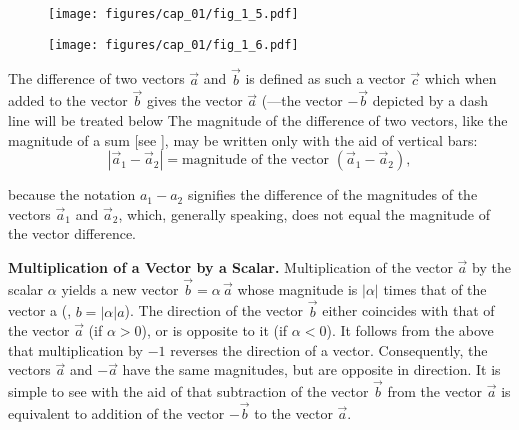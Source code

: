 \begin{figure}[t]
	\begin{minipage}[t]{0.5\linewidth}
		\begin{center}
			\texttt{[image: figures/cap\_01/fig\_1\_5.pdf]}
			\caption[]{}
			\label{fig:1_5}
		\end{center}
	\end{minipage}
	\hfill{ }%
	\begin{minipage}[t]{0.5\linewidth}
		\begin{center}
			\texttt{[image: figures/cap\_01/fig\_1\_6.pdf]}
			\caption[]{}
			\label{fig:1_6}
		\end{center}
	\end{minipage}
\vspace{-0.7cm}
\end{figure}

The difference of two vectors $\vec{a}$ and $\vec{b}$ is defined as such a vector $\vec{c}$ which when added to the vector $\vec{b}$ gives the vector $\vec{a}$ (---the vector $-\vec{b}$ depicted by a dash line will be treated below The magnitude of the difference of two vectors, like the magnitude of a sum [see ], may be written only with the aid of vertical bars:
\begin{equation}\label{eq:1_2}
|\vec{a}_1 - \vec{a}_2| = \text{magnitude of the vector } (\vec{a}_1 - \vec{a}_2),
\end{equation}

\noindent
because the notation $a_1-a_2$ signifies the difference of the magnitudes of the vectors $\vec{a}_1$ and $\vec{a}_2$, which, generally speaking, does not equal the magnitude of the vector difference.

\textbf{Multiplication of a Vector by a Scalar.} Multiplication of the vector $\vec{a}$ by the scalar $\alpha$ yields a new vector $\vec{b}=\alpha\,\vec{a}$ whose magnitude is $|\alpha|$ times that of the vector a (\ie, $b=|\alpha|a$). The direction of the vector $\vec{b}$ either coincides with that of the vector $\vec{a}$ (if $\alpha>0$), or is opposite to it (if $\alpha<0$). It follows from the above that multiplication by $-1$ reverses the direction of a vector. Consequently, the vectors $\vec{a}$ and $-\vec{a}$ have the same magnitudes, but are opposite in direction. It is simple to see with the aid of   that subtraction of the vector $\vec{b}$ from the vector $\vec{a}$ is equivalent to addition of the vector $-\vec{b}$ to the vector $\vec{a}$.

